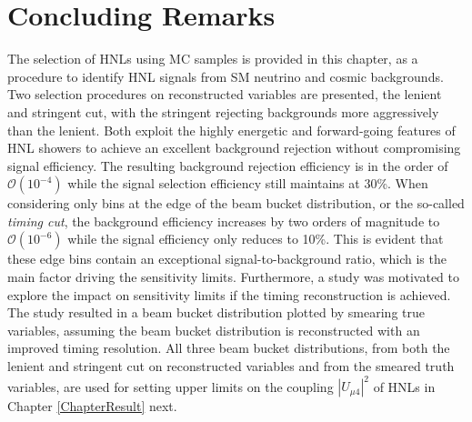 
\section{Concluding Remarks}
\label{sec:select_conclude}

The selection of HNLs using MC samples is provided in this chapter, as a procedure to identify HNL signals from SM neutrino and cosmic backgrounds.
Two selection procedures on reconstructed variables are presented, the lenient and stringent cut, with the stringent rejecting backgrounds more aggressively than the lenient.
Both exploit the highly energetic and forward-going features of HNL showers to achieve an excellent background rejection without compromising signal efficiency.
The resulting background rejection efficiency is in the order of $\mathcal{O}(10^{-4})$ while the signal selection efficiency still maintains at 30\%. 
When considering only bins at the edge of the beam bucket distribution, or the so-called \textit{timing cut}, the background efficiency increases by two orders of magnitude to $\mathcal{O}(10^{-6})$ while the signal efficiency only reduces to 10\%. 
This is evident that these edge bins contain an exceptional signal-to-background ratio, which is the main factor driving the sensitivity limits.
Furthermore, a study was motivated to explore the impact on sensitivity limits if the timing reconstruction is achieved.
The study resulted in a beam bucket distribution plotted by smearing true variables, assuming the beam bucket distribution is reconstructed with an improved timing resolution.
All three beam bucket distributions, from both the lenient and stringent cut on reconstructed variables and from the smeared truth variables, are used for setting upper limits on the coupling $|U_{\mu4}|^2$ of HNLs in Chapter \ref{ChapterResult} next. 


